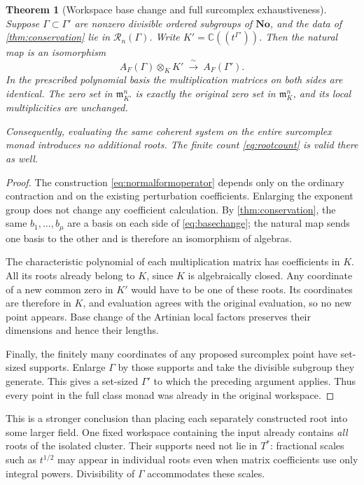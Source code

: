 \documentclass[11pt]{article}
\newtheorem{theorem}{Theorem}[section]
\theoremstyle{definition}
\newcommand{\C}{\mathbb C}
\newcommand{\No}{\mathbf{No}}
\newcommand{\RR}{\mathscr R}
\newcommand{\mm}{\mathfrak m}
\begin{document}
\begin{theorem}[Workspace base change and full surcomplex exhaustiveness]\label{thm:basechange}
Suppose $\Gamma\subset\Gamma'$ are nonzero divisible ordered subgroups of $\No$, and the data of \cref{thm:conservation} lie in $\RR_n(\Gamma)$. Write $K'=\C((t^{\Gamma'}))$. Then the natural map is an isomorphism
\begin{equation}\label{eq:basechange}
 A_F(\Gamma)\otimes_KK'\ \xrightarrow{\ \sim\ }\ A_F(\Gamma').
\end{equation}
In the prescribed polynomial basis the multiplication matrices on both sides are identical. The zero set in $\mm_{K'}^n$ is exactly the original zero set in $\mm_K^n$, and its local multiplicities are unchanged.

Consequently, evaluating the same coherent system on the entire surcomplex monad introduces no additional roots. The finite count \eqref{eq:rootcount} is valid there as well.
\end{theorem}
\begin{proof}
The construction \eqref{eq:normalformoperator} depends only on the ordinary contraction and on the existing perturbation coefficients. Enlarging the exponent group does not change any coefficient calculation. By \cref{thm:conservation}, the same $b_1,\ldots,b_\mu$ are a basis on each side of \eqref{eq:basechange}; the natural map sends one basis to the other and is therefore an isomorphism of algebras.

The characteristic polynomial of each multiplication matrix has coefficients in $K$. All its roots already belong to $K$, since $K$ is algebraically closed. Any coordinate of a new common zero in $K'$ would have to be one of these roots. Its coordinates are therefore in $K$, and evaluation agrees with the original evaluation, so no new point appears. Base change of the Artinian local factors preserves their dimensions and hence their lengths.

Finally, the finitely many coordinates of any proposed surcomplex point have set-sized supports. Enlarge $\Gamma$ by those supports and take the divisible subgroup they generate. This gives a set-sized $\Gamma'$ to which the preceding argument applies. Thus every point in the full class monad was already in the original workspace.
\end{proof}
This is a stronger conclusion than placing each separately constructed root into some larger field. One fixed workspace containing the input already contains \emph{all} roots of the isolated cluster. Their supports need not lie in $T^*$: fractional scales such as $t^{1/2}$ may appear in individual roots even when matrix coefficients use only integral powers. Divisibility of $\Gamma$ accommodates these scales.
\end{document}
